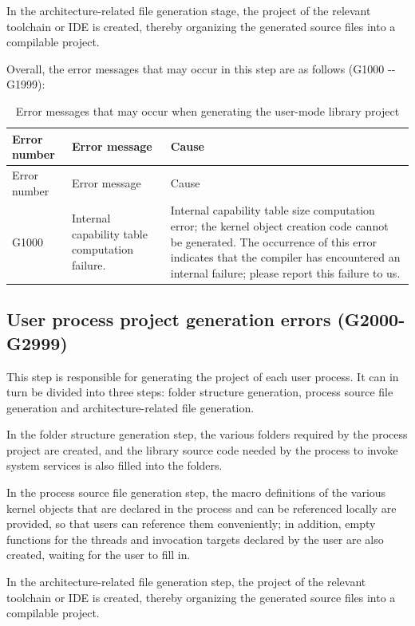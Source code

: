 In the architecture-related file generation stage, the project of the relevant toolchain or IDE is created, thereby organizing the generated source files into a compilable project.

Overall, the error messages that may occur in this step are as follows (G1000 -\/- G1999):

\begin{xltabular}{\textwidth}{@{}>{\hsize\raggedright\arraybackslash}X>{\hsize\raggedright\arraybackslash}X>{\hsize\raggedright\arraybackslash}X@{}}
\caption{Error messages that may occur when generating the user-mode library project}\label{tab:5-27}\\
\toprule
Error number & Error message & Cause\tabularnewline
\endfirsthead
\toprule
Error number & Error message & Cause\tabularnewline
\midrule
\endhead
\bottomrule
\endlastfoot
G1000 & Internal capability table computation failure. &
Internal capability table size computation error; the kernel object creation code cannot be generated. The occurrence of this error indicates that the compiler has encountered an internal failure; please report this failure to us.\tabularnewline
\end{xltabular}

\subsection{User process project generation errors (G2000-G2999)}\label{subsec:5-6-9}

This step is responsible for generating the project of each user process. It can in turn be divided into three steps: folder structure generation, process source file generation and architecture-related file generation.

In the folder structure generation step, the various folders required by the process project are created, and the library source code needed by the process to invoke system services is also filled into the folders.

In the process source file generation step, the macro definitions of the various kernel objects that are declared in the process and can be referenced locally are provided, so that users can reference them conveniently; in addition, empty functions for the threads and invocation targets declared by the user are also created, waiting for the user to fill in.

In the architecture-related file generation step, the project of the relevant toolchain or IDE is created, thereby organizing the generated source files into a compilable project.

